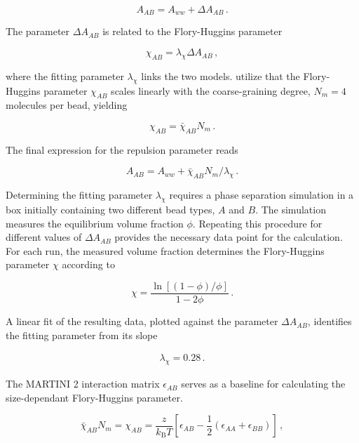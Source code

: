 \documentclass[
    11pt,
    a4paper,
    oneside,        %
    BCOR=10mm,      %
    parskip=half,   %
    listof=nototoc,   %
    bibliography=totoc %
]{scrreprt}
\begin{document}
\begin{equation}
    A_{AB} = A_{ww} + \Delta A_{AB}\, .
\end{equation}

The parameter $\Delta A_{AB}$ is related to the Flory-Huggins parameter 

\begin{equation}
    \chi_{AB} = \lambda_\chi \Delta A_{AB}\, ,
\end{equation}

where the fitting parameter $\lambda_\chi$ links the two models. \citeauthor{Wang2024} \cite{Wang2024} utilize that the Flory-Huggins parameter $\chi_{AB}$ scales linearly with the coarse-graining degree, $N_m = 4$ molecules per bead, yielding 

\begin{equation}
    \chi_{AB} = \bar{\chi}_{AB} N_m\, .
\end{equation}

The final expression for the repulsion parameter reads

\begin{equation}
    A_{AB} = A_{ww} + \bar{\chi}_{AB} N_m/\lambda_\chi\, . \label{final_form_dpd}
\end{equation}

Determining the fitting parameter $\lambda_\chi$ requires a phase separation simulation in a box initially containing two different bead types, $A$ and $B$. The simulation measures the equilibrium volume fraction $\phi$. Repeating this procedure for different values of $\Delta A_{AB}$ provides the necessary data point for the calculation. For each run, the measured volume fraction determines the Flory-Huggins parameter $\chi$ according to

\begin{equation}
    \chi = \frac{\ln[(1-\phi)/\phi]}{1 - 2\phi}\, .
\end{equation}

A linear fit of the resulting data, plotted against the parameter $\Delta A_{AB}$, identifies the fitting parameter from its slope 

\begin{align}
    \lambda_\chi = 0.28\, .
\end{align}

The MARTINI 2 interaction matrix $\epsilon_{AB}$ \cite{Martini} serves as a baseline for calculating the size-dependant Flory-Huggins parameter.

\begin{equation}
    \bar{\chi}_{AB}N_m = \chi_{AB} = \frac{z}{k_{\mathrm{B}}T} \left[\epsilon_{AB} - 
    \frac{1}{2} (\epsilon_{AA} + \epsilon_{BB}) \right] \, ,
\end{equation}
\end{document}
